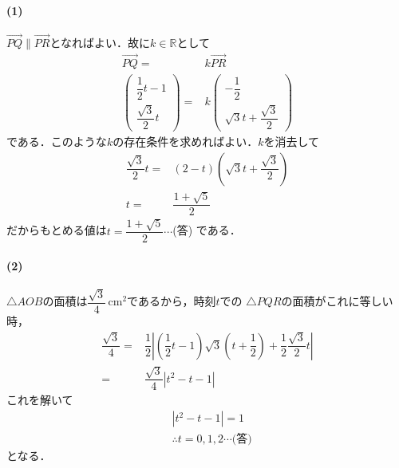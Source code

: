 \documentclass[../../main.tex]{subfiles}
\begin{document}
\paragraph{(1)}
$\overrightarrow{PQ}\parallel\overrightarrow{PR}$となればよい．故に$k\in\mathbb{R}$として
\begin{align}
  \overrightarrow{PQ}=&k\overrightarrow{PR} \\
  \begin{pmatrix}
    \dfrac{1}{2}t-1 \\
    \dfrac{\sqrt{3}}{2}t
  \end{pmatrix}
  =&k
  \begin{pmatrix}
    -\dfrac{1}{2} \\
    \sqrt{3}t+\dfrac{\sqrt{3}}{2}
  \end{pmatrix}
\end{align}
である．このような$k$の存在条件を求めればよい．$k$を消去して
\begin{align}
  \dfrac{\sqrt{3}}{2}t=&(2-t)(\sqrt{3}t+\dfrac{\sqrt{3}}{2}) \\
  t=&\dfrac{1+\sqrt{5}}{2}
\end{align}
だからもとめる値は$t=\dfrac{1+\sqrt{5}}{2}\cdots$(答) である．

\paragraph{(2)}

$\triangle AOB$の面積は$\dfrac{\sqrt{3}}{4}\,\mathrm{cm^2}$であるから，時刻$t$での
$\triangle PQR$の面積がこれに等しい時，
\begin{align}
  \dfrac{\sqrt{3}}{4}=&\dfrac{1}{2}\left|\left(\dfrac{1}{2}t-1\right)\sqrt{3}\left(t+\dfrac{1}{2}\right)%
  +\dfrac{1}{2}\dfrac{\sqrt{3}}{2}t\right| \\
  = &\dfrac{\sqrt{3}}{4}\left|t^2-t-1\right|
\end{align}
これを解いて
\begin{align}
  &\left|t^2-t-1\right|=1 \\
  &\therefore  t=0,1,2 \cdots\text{(答)}
\end{align}
となる．

\newpage
\end{document}
